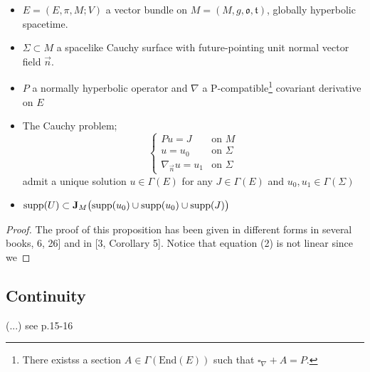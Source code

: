 \documentclass[a4paper,12pt]{scrartcl}    %
\begin{document}
	\begin{proposition}
	$ $
		\begin{hypothesis}
			\begin{itemize}
				\item $E=(E,\pi,M;V)$ a vector bundle on $M = (M,g,\mathfrak{o},\mathfrak{t}) $, globally hyperbolic spacetime.
				\item $\Sigma \subset M$ a spacelike Cauchy surface with future-pointing unit normal vector field $\vec{n}$.
				\item $P$ a normally hyperbolic operator and $\nabla$ a P-compatible\footnote{There existss a section $A \in \Gamma(\textrm{End}(E))$ such that $\square_\nabla + A = P$.} covariant derivative on $E$
			\end{itemize}
		\end{hypothesis}
	\begin{thesis}
		\begin{itemize}
			\item The Cauchy problem;
				\begin{displaymath}
					\begin{cases} 
						P u = J & \textrm{on $M$} \\ 
						u = u_0 & \textrm{on $\Sigma$}\\ 
						\nabla_{\vec{n}}u= u_1  & \textrm{on $\Sigma$}
					\end{cases}
				\end{displaymath}
				admit a unique solution $u\in \Gamma(E)$ for any $J\in \Gamma(E)$ and $ u_0,u_1 \in \Gamma(\Sigma)$
			\item $\textrm{supp}(U) \subset \mathbf{J}_M \big( \textrm{supp}(u_0) \cup \textrm{supp}(u_0) \cup \textrm{supp}(J) \big)$
		\end{itemize}
	\end{thesis}
	\end{proposition}	
	\begin{proof}
		The proof of this proposition has been given in different forms in several books, \cite{barwav}6, 26] and in [3, Corollary 5]. Notice that equation (2) is not linear since we
	\end{proof}
		
	\subsection{Continuity}
		(...) see  p.15-16 \cite{primer}
\end{document}

